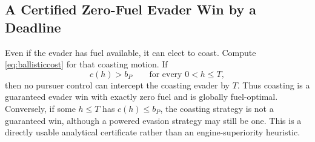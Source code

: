 \documentclass[journal,a4paper]{IEEEtran}
\begin{document}
\subsection{A Certified Zero-Fuel Evader Win by a Deadline}
Even if the evader has fuel available, it can elect to coast. Compute \eqref{eq:ballisticcost} for that coasting motion. If
\begin{equation}
 c(h)>b_P\qquad\text{for every }0<h\le T,
 \label{eq:coastwin}
\end{equation}
then no pursuer control can intercept the coasting evader by $T$. Thus coasting is a guaranteed evader win with exactly zero fuel and is globally fuel-optimal. Conversely, if some $h\le T$ has $c(h)\le b_P$, the coasting strategy is not a guaranteed win, although a powered evasion strategy may still be one. This is a directly usable analytical certificate rather than an engine-superiority heuristic.
\end{document}
